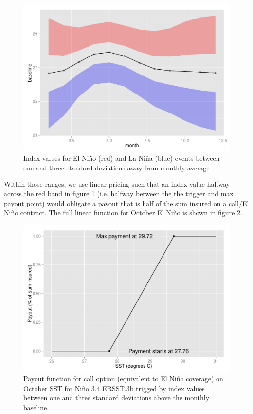 \documentclass[authoryear]{article}
\begin{document}
\begin{figure}[!htbp]
  \includegraphics[width=\linewidth]{Pricingfigs/optionParamsByMonth}
  \caption{Index values for El Ni\~no (red) and La Ni\~na (blue) events between one and three standard deviations away from monthly average}
   \label{fig:optionParamsByMonth}
\end{figure}

Within those ranges, we use linear pricing such that an index value halfway across the red band in figure \ref{fig:optionParamsByMonth} (i.e. halfway between the the trigger and max payout point) would obligate a payout that is half of the sum insured on a call/El Ni\~no contract. The full linear function for October El Ni\~no is shown in figure \ref{fig:payouyt10callex}. 

\begin{figure}[!htbp]
  \includegraphics[width=\linewidth]{Pricingfigs/payoutExamplemonth10contractType1}
  \caption{Payout function for call option (equivalent to El Ni\~no coverage) on October SST for Ni\~no 3.4 ERSST.3b trigged by index values between one and three standard deviations above the monthly baseline.}
   \label{fig:payouyt10callex}
\end{figure}
\end{document}
